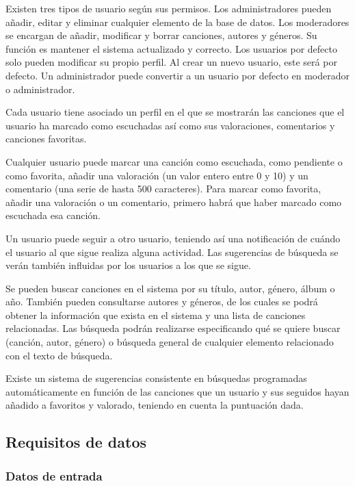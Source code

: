 Existen tres tipos de usuario según sus permisos. Los administradores pueden añadir, editar y eliminar cualquier elemento de la base de datos. Los moderadores se encargan de añadir, modificar y borrar canciones, autores y géneros. Su función es mantener el sistema actualizado y correcto. Los usuarios por defecto solo pueden modificar su propio perfil. Al crear un nuevo usuario, este será por defecto. Un administrador puede convertir a un usuario por defecto en moderador o administrador.

Cada usuario tiene asociado un perfil en el que se mostrarán las canciones que el usuario ha marcado como escuchadas así como sus valoraciones, comentarios y canciones favoritas.


Cualquier usuario puede marcar una canción como escuchada, como pendiente o como favorita, añadir una valoración (un valor entero entre 0 y 10) y un comentario (una serie de hasta 500 caracteres). Para marcar como favorita, añadir una valoración o un comentario, primero habrá que haber marcado como escuchada esa canción.

Un usuario puede seguir a otro usuario, teniendo así una notificación de cuándo el usuario al que sigue realiza alguna actividad. Las sugerencias de búsqueda se verán también influidas por los usuarios a los que se sigue.



Se pueden buscar canciones en el sistema por su título, autor, género, álbum o año. También pueden consultarse autores y géneros, de los cuales se podrá obtener la información que exista en el sistema y una lista de canciones relacionadas. Las búsqueda podrán realizarse especificando qué se quiere buscar (canción, autor, género) o búsqueda general de cualquier elemento relacionado con el texto de búsqueda.

Existe un sistema de sugerencias consistente en búsquedas programadas automáticamente en función de las canciones que un usuario y sus seguidos hayan añadido a favoritos y valorado, teniendo en cuenta la puntuación dada.

\subsection{Requisitos de datos}
\subsubsection{Datos de entrada}

